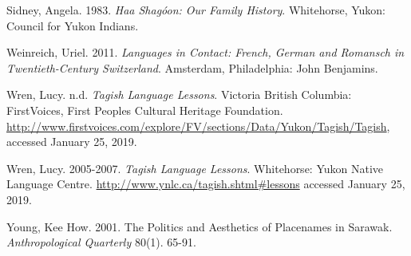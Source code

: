 \begin{hang}
Sidney, Angela. 1983. \textit{Haa Shagóon: Our Family History}. Whitehorse, Yukon: Council for Yukon Indians.

Weinreich, Uriel. 2011. \textit{Languages in Contact: French, German and Romansch in Twentieth-Century Switzerland}. Amsterdam, Philadelphia: John Benjamins.

Wren, Lucy. n.d. \textit{Tagish Language Lessons}. Victoria British Columbia: FirstVoices, First Peoples Cultural Heritage Foundation. \url{http://www.firstvoices.com/explore/FV/sections/Data/Yukon/Tagish/Tagish}, accessed January 25, 2019.

Wren, Lucy. 2005-2007.	\textit{Tagish Language Lessons}. Whitehorse: Yukon Native Language Centre.
\url{http://www.ynlc.ca/tagish.shtml#lessons}
accessed January 25, 2019.

Young, Kee How. 2001. The Politics and Aesthetics of Placenames in Sarawak. \textit{Anthropological Quarterly} 80(1). 65-91.

\end{hang}


\label{moore-ch-end}
